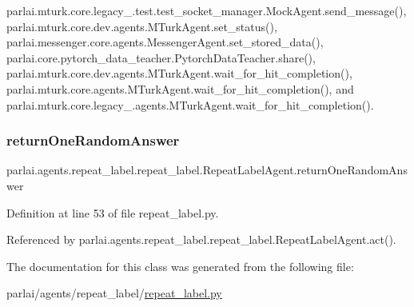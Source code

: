 parlai.\+mturk.\+core.\+legacy\+\_.\+test.\+test\+\_\+socket\+\_\+manager.\+Mock\+Agent.\+send\+\_\+message(), parlai.\+mturk.\+core.\+dev.\+agents.\+M\+Turk\+Agent.\+set\+\_\+status(), parlai.\+messenger.\+core.\+agents.\+Messenger\+Agent.\+set\+\_\+stored\+\_\+data(), parlai.\+core.\+pytorch\+\_\+data\+\_\+teacher.\+Pytorch\+Data\+Teacher.\+share(), parlai.\+mturk.\+core.\+dev.\+agents.\+M\+Turk\+Agent.\+wait\+\_\+for\+\_\+hit\+\_\+completion(), parlai.\+mturk.\+core.\+agents.\+M\+Turk\+Agent.\+wait\+\_\+for\+\_\+hit\+\_\+completion(), and parlai.\+mturk.\+core.\+legacy\+\_.\+agents.\+M\+Turk\+Agent.\+wait\+\_\+for\+\_\+hit\+\_\+completion().

\mbox{\label{classparlai_1_1agents_1_1repeat__label_1_1repeat__label_1_1RepeatLabelAgent_a97ae22e8d6f0c58194ee3d92970918e7}} 
\subsubsection{\texorpdfstring{return\+One\+Random\+Answer}{returnOneRandomAnswer}}
{\footnotesize\ttfamily parlai.\+agents.\+repeat\+\_\+label.\+repeat\+\_\+label.\+Repeat\+Label\+Agent.\+return\+One\+Random\+Answer}



Definition at line 53 of file repeat\+\_\+label.\+py.



Referenced by parlai.\+agents.\+repeat\+\_\+label.\+repeat\+\_\+label.\+Repeat\+Label\+Agent.\+act().



The documentation for this class was generated from the following file\+:\begin{DoxyCompactItemize}
\item 
parlai/agents/repeat\+\_\+label/\hyperlink{repeat__label_8py}{repeat\+\_\+label.\+py}\end{DoxyCompactItemize}
